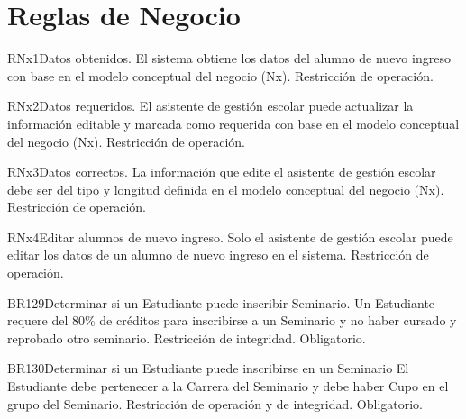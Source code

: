 \section{Reglas de Negocio}
\begin{BussinesRule}{RNx1}{Datos obtenidos.} 
	\BRitem[Descripción:] El sistema obtiene los datos del alumno de nuevo ingreso con base en el modelo conceptual del negocio (Nx).
	\BRitem[Tipo:] Restricción de operación.
	
\end{BussinesRule}

\begin{BussinesRule}{RNx2}{Datos requeridos.} 
	\BRitem[Descripción:] El asistente de gestión escolar puede actualizar la información editable y marcada como requerida con base en el modelo conceptual del negocio (Nx).
	\BRitem[Tipo:] Restricción de operación.
	
\end{BussinesRule}

\begin{BussinesRule}{RNx3}{Datos correctos.} 
	\BRitem[Descripción:] La información que edite el asistente de gestión escolar debe ser del tipo y longitud definida en el modelo conceptual del negocio (Nx).
	\BRitem[Tipo:] Restricción de operación.
	
\end{BussinesRule}

\begin{BussinesRule}{RNx4}{Editar alumnos de nuevo ingreso.} 
	\BRitem[Descripción:] Solo el asistente de gestión escolar puede editar los datos de un alumno de nuevo ingreso en el sistema.
	\BRitem[Tipo:] Restricción de operación.
	
\end{BussinesRule}


\begin{BussinesRule}{BR129}{Determinar si un Estudiante puede inscribir Seminario.} 
	\BRitem[Descripción:] Un Estudiante requere del 80\% de créditos para inscribirse a un Seminario y no haber cursado y reprobado otro seminario.
	\BRitem[Tipo:] Restricción de integridad.
	\BRitem[Nivel:] Obligatorio.
\end{BussinesRule}

\begin{BussinesRule}{BR130}{Determinar si un Estudiante puede inscribirse en un Seminario}
	\BRitem[Descripción:] El Estudiante debe pertenecer a la Carrera del Seminario y debe haber Cupo en el grupo del Seminario.
	\BRitem[Tipo:] Restricción de operación y de integridad.
	\BRitem[Nivel:] Obligatorio.
\end{BussinesRule}

